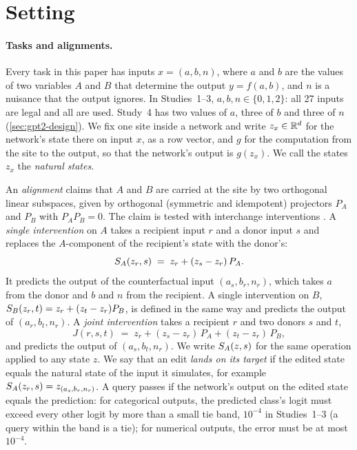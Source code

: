 \section{Setting}\label{sec:setting}

\paragraph{Tasks and alignments.}
Every task in this paper has inputs $x=(a,b,n)$, where $a$ and $b$ are the values of two variables $A$ and $B$ that
determine the output $y=f(a,b)$, and $n$ is a nuisance that the output ignores. In Studies~1--3, $a,b,n\in\{0,1,2\}$:
all 27 inputs are legal and all are used. Study~4 has two values of $a$, three of $b$ and three of $n$
(\cref{sec:gpt2-design}). We fix one site inside a network and write $z_x\in\mathbb{R}^d$ for the network's state there on
input $x$, as a row vector, and $g$ for the computation from the site to the output, so that the network's output is
$g(z_x)$. We call the states $z_x$ the \emph{natural states}.

An \emph{alignment} claims that $A$ and $B$ are carried at the site by two orthogonal linear subspaces, given by
orthogonal (symmetric and idempotent) projectors $P_A$ and $P_B$ with $P_AP_B=0$. The claim is tested with
interchange interventions \citep{geiger2021causal,geiger2024das}. A \emph{single intervention} on $A$ takes a
recipient input $r$ and a donor input $s$ and replaces the $A$-component of the recipient's state with the
donor's:
\begin{equation}\label{eq:single}
  S_A(z_r,s) \;=\; z_r + (z_s-z_r)\,P_A .
\end{equation}
It predicts the output of the counterfactual input $(a_s,b_r,n_r)$, which takes $a$ from the donor and $b$ and $n$
from the recipient. A single intervention on $B$, $S_B(z_r,t)=z_r+(z_t-z_r)P_B$, is defined in the same way and
predicts the output of $(a_r,b_t,n_r)$. A \emph{joint intervention} takes a recipient $r$ and two donors $s$ and
$t$,
\begin{equation}\label{eq:joint}
  J(r,s,t) \;=\; z_r + (z_s-z_r)\,P_A + (z_t-z_r)\,P_B ,
\end{equation}
and predicts the output of $(a_s,b_t,n_r)$. We write $S_A(z,s)$ for the same operation applied to any state $z$.
We say that an edit \emph{lands on its target} if the edited state equals the natural state of the input it
simulates, for example $S_A(z_r,s)=z_{(a_s,b_r,n_r)}$. A query passes if the network's output on the edited state
equals the prediction: for categorical outputs, the predicted class's logit must exceed every other logit by more
than a small tie band, $10^{-4}$ in Studies~1--3 (a query within the band is a tie); for numerical outputs, the error
must be at most $10^{-4}$.

